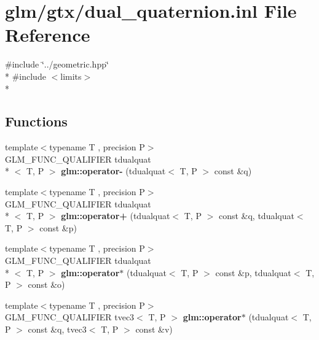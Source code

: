 \hypertarget{dual__quaternion_8inl}{\section{glm/gtx/dual\-\_\-quaternion.inl File Reference}
\label{dual__quaternion_8inl}
}
{\ttfamily \#include \char`\"{}../geometric.\-hpp\char`\"{}}\\*
{\ttfamily \#include $<$limits$>$}\\*
\subsection*{Functions}
\begin{DoxyCompactItemize}
\item 
\hypertarget{namespaceglm_a6502f16b761d62c1a4d9558c8403c509}{{\footnotesize template$<$typename T , precision P$>$ }\\G\-L\-M\-\_\-\-F\-U\-N\-C\-\_\-\-Q\-U\-A\-L\-I\-F\-I\-E\-R tdualquat\\*
$<$ T, P $>$ {\bfseries glm\-::operator-\/} (tdualquat$<$ T, P $>$ const \&q)}\label{namespaceglm_a6502f16b761d62c1a4d9558c8403c509}

\item 
\hypertarget{group__gtx__dual__quaternion_ga9d7cfca38c6ff90757705600da3c7972}{{\footnotesize template$<$typename T , precision P$>$ }\\G\-L\-M\-\_\-\-F\-U\-N\-C\-\_\-\-Q\-U\-A\-L\-I\-F\-I\-E\-R tdualquat\\*
$<$ T, P $>$ {\bfseries glm\-::operator+} (tdualquat$<$ T, P $>$ const \&q, tdualquat$<$ T, P $>$ const \&p)}\label{group__gtx__dual__quaternion_ga9d7cfca38c6ff90757705600da3c7972}

\item 
\hypertarget{group__gtx__dual__quaternion_ga2c224f87242fe82e8ebc17f01aa51126}{{\footnotesize template$<$typename T , precision P$>$ }\\G\-L\-M\-\_\-\-F\-U\-N\-C\-\_\-\-Q\-U\-A\-L\-I\-F\-I\-E\-R tdualquat\\*
$<$ T, P $>$ {\bfseries glm\-::operator$\ast$} (tdualquat$<$ T, P $>$ const \&p, tdualquat$<$ T, P $>$ const \&o)}\label{group__gtx__dual__quaternion_ga2c224f87242fe82e8ebc17f01aa51126}

\item 
\hypertarget{namespaceglm_af87c18c3c73e45b62f6d895c323f4a5f}{{\footnotesize template$<$typename T , precision P$>$ }\\G\-L\-M\-\_\-\-F\-U\-N\-C\-\_\-\-Q\-U\-A\-L\-I\-F\-I\-E\-R tvec3$<$ T, P $>$ {\bfseries glm\-::operator$\ast$} (tdualquat$<$ T, P $>$ const \&q, tvec3$<$ T, P $>$ const \&v)}\label{namespaceglm_af87c18c3c73e45b62f6d895c323f4a5f}


\end{DoxyCompactItemize}
